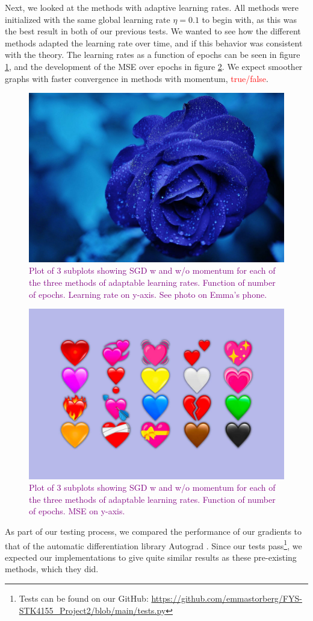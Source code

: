 Next, we looked at the methods with adaptive learning rates. All methods were initialized with the same global learning rate $\eta = 0.1$ to begin with, as this was the best result in both of our previous tests. We wanted to see how the different methods adapted the learning rate over time, and if this behavior was consistent with the theory. The learning rates as a function of epochs can be seen in figure \ref{fig:learningratesGD}, and the development of the MSE over epochs in figure \ref{fig:MSEGD}. We expect smoother graphs with faster convergence in methods with momentum, \textcolor{red}{true/false}.
\begin{figure}
    \centering
    \includegraphics[width=0.5\linewidth]{figures/placeholders/learningratesGD.png}
    \caption{\textcolor{purple}{Plot of 3 subplots showing SGD w and w/o momentum for each of the three methods of adaptable learning rates.  Function of number of epochs. Learning rate on y-axis. See photo on Emma's phone.}}
    \label{fig:learningratesGD}
\end{figure}

\begin{figure}
    \centering
    \includegraphics[width=0.5\linewidth]{figures/placeholders/MSEGD.png}
    \caption{\textcolor{purple}{Plot of 3 subplots showing SGD w and w/o momentum for each of the three methods of adaptable learning rates.  Function of number of epochs. MSE on y-axis.}}
    \label{fig:MSEGD}
\end{figure}

As part of our testing process, we compared the performance of our gradients to that of the automatic differentiation library Autograd \cite{autograd}. Since our tests pass\footnote{Tests can be found on our GitHub: \url{https://github.com/emmastorberg/FYS-STK4155_Project2/blob/main/tests.py}}, we expected our implementations to give quite similar results as these pre-existing methods, which they did. 


